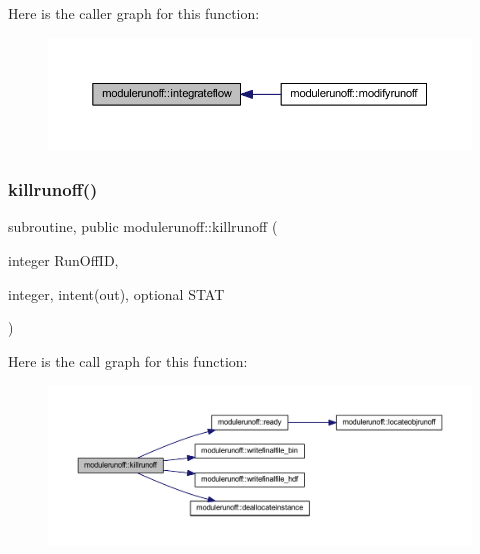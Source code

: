 Here is the caller graph for this function\+:
\nopagebreak
\begin{figure}[H]
\begin{center}
\leavevmode
\includegraphics[width=350pt]{namespacemodulerunoff_ad94c220c4dbba10ee5046785e9e782e9_icgraph}
\end{center}
\end{figure}
\mbox{\label{namespacemodulerunoff_aa17d0391187f304ab3410eb5d26a4711}} 
\subsubsection{\texorpdfstring{killrunoff()}{killrunoff()}}
{\footnotesize\ttfamily subroutine, public modulerunoff\+::killrunoff (\begin{DoxyParamCaption}\item[{integer}]{Run\+Off\+ID,  }\item[{integer, intent(out), optional}]{S\+T\+AT }\end{DoxyParamCaption})}

Here is the call graph for this function\+:
\nopagebreak
\begin{figure}[H]
\begin{center}
\leavevmode
\includegraphics[width=350pt]{namespacemodulerunoff_aa17d0391187f304ab3410eb5d26a4711_cgraph}
\end{center}
\end{figure}
\mbox{\label{namespacemodulerunoff_ac9ce40d4e0d4a7a1faa6f0a7fd6eca2f}} 
